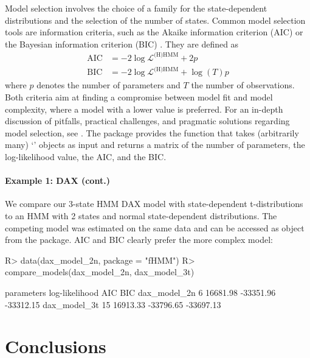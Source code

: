 \documentclass[article]{jss}
\newcommand{\class}[1]{`\code{#1}'}
\newcommand{\fct}[1]{\code{#1()}}
\begin{document}
Model selection involves the choice of a family for the state-dependent distributions and the selection of the number of states. Common model selection tools are information criteria, such as the Akaike information criterion (AIC) \citep{aka74} or the Bayesian information criterion (BIC) \citep{sch78}. They are defined as
\begin{align*}
\text{AIC} &= - 2 \log \mathcal{L}^\text{(H)HMM} + 2 p \\
\text{BIC} &= - 2 \log \mathcal{L}^\text{(H)HMM} + \log(T) p
\end{align*}
where $p$ denotes the number of parameters and $T$ the number of observations. Both criteria aim at finding a compromise between model fit and model complexity, where a model with a lower value is preferred. For an in-depth discussion of pitfalls, practical challenges, and pragmatic solutions regarding model selection, see \cite{poh17}. The  package provides the \fct{compare\_models} function that takes (arbitrarily many) \class{fHMM\_model} objects as input and returns a matrix of the number of parameters, the log-likelihood value, the AIC, and the BIC. 

\paragraph{Example 1: DAX (cont.)} We compare our 3-state HMM DAX model with state-dependent t-distributions to an HMM with 2 states and normal state-dependent distributions. The competing model was estimated on the same data and can be accessed as object  from the package. AIC and BIC clearly prefer the more complex model:

%
\begin{Schunk}
\begin{Sinput}
R> data(dax_model_2n, package = "fHMM")
R> compare_models(dax_model_2n, dax_model_3t)
\end{Sinput}
\begin{Soutput}
             parameters log-likelihood       AIC       BIC
dax_model_2n          6       16681.98 -33351.96 -33312.15
dax_model_3t         15       16913.33 -33796.65 -33697.13
\end{Soutput}
\end{Schunk}
%


\section{Conclusions} \label{sec:conclusion} %
\end{document}
